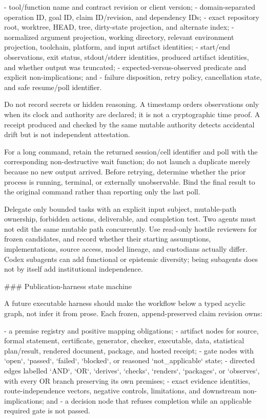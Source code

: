 \documentclass[11pt]{article}
\begin{document}
\begin{markdown}
- tool/function name and contract revision or client version;
- domain-separated operation ID, goal ID, claim ID/revision, and dependency IDs;
- exact repository root, worktree, HEAD, tree, dirty-state projection, and alternate index;
- normalized argument projection, working directory, relevant environment projection, toolchain,
  platform, and input artifact identities;
- start/end observations, exit status, stdout/stderr identities, produced artifact identities, and
  whether output was truncated;
- expected-versus-observed predicate and explicit non-implications; and
- failure disposition, retry policy, cancellation state, and safe resume/poll identifier.

Do not record secrets or hidden reasoning. A timestamp orders observations only when its clock and
authority are declared; it is not a cryptographic time proof. A receipt produced and checked by the
same mutable authority detects accidental drift but is not independent attestation.

For a long command, retain the returned session/cell identifier and poll with the corresponding
non-destructive wait function; do not launch a duplicate merely because no new output arrived.
Before retrying, determine whether the prior process is running, terminal, or externally
unobservable. Bind the final result to the original command rather than reporting only the last
poll.

Delegate only bounded tasks with an explicit input subject, mutable-path ownership, forbidden
actions, deliverable, and completion test. Two agents must not edit the same mutable path
concurrently. Use read-only hostile reviewers for frozen candidates, and record whether their
starting assumptions, implementations, source access, model lineage, and custodians actually differ.
Codex subagents can add functional or epistemic diversity; being subagents does not by itself add
institutional independence.

### Publication-harness state machine

A future executable harness should make the workflow below a typed acyclic graph, not infer it from
prose. Each frozen, append-preserved claim revision owns:

- a premise registry and positive mapping obligations;
- artifact nodes for source, formal statement, certificate, generator, checker, executable, data,
  statistical plan/result, rendered document, package, and hosted receipt;
- gate nodes with `open`, `passed`, `failed`, `blocked`, or reasoned `not_applicable` state;
- directed edges labelled `AND`, `OR`, `derives`, `checks`, `renders`, `packages`, or
  `observes`, with every OR branch preserving its own premises;
- exact evidence identities, route-independence vectors, negative controls, limitations, and
  downstream non-implications; and
- a decision node that refuses completion while an applicable required gate is not passed.


\end{markdown}
\end{document}

